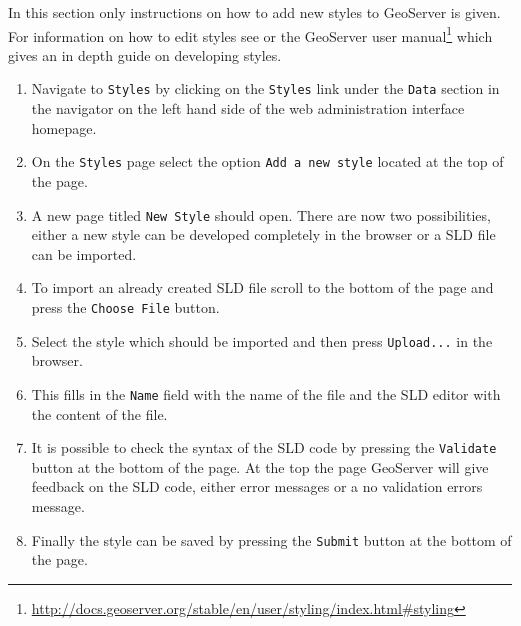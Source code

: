 In this section only instructions on how to add new styles to GeoServer is given. For information on how to edit styles see  or the GeoServer user manual\footnote{\url{http://docs.geoserver.org/stable/en/user/styling/index.html\#styling}} which gives an in depth guide on developing styles.

\begin{enumerate}
	\item Navigate to \lstinline|Styles| by clicking on the \lstinline|Styles| link under the \lstinline|Data| section in the navigator on the left hand side of the web administration interface homepage.
	\item On the \lstinline|Styles| page select the option \lstinline|Add a new style| located at the top of the page.
	\item A new page titled \lstinline|New Style| should open. There are now two possibilities, either a new style can be developed completely in the browser or a SLD file can be imported.
	\item To import an already created SLD file scroll to the bottom of the page and press the \lstinline|Choose File| button.
	\item Select the style which should be imported and then press \lstinline|Upload...| in the browser.
	\item This fills in the \lstinline|Name| field with the name of the file and the SLD editor with the content of the file.
	\item It is possible to check the syntax of the SLD code by pressing the \lstinline|Validate| button at the bottom of the page. At the top the page GeoServer will give feedback on the SLD code, either error messages or a no validation errors message.
	\item Finally the style can be saved by pressing the \lstinline|Submit| button at the bottom of the page.
\end{enumerate}
